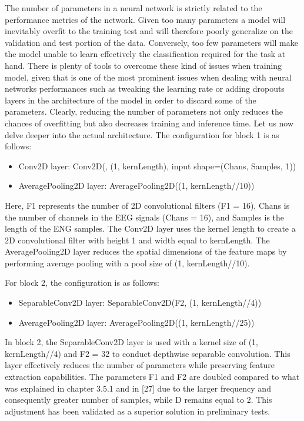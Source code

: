 \documentclass{Configuration_Files/PoliMi3i_thesis}
\begin{document}
The number of parameters in a neural network is strictly related to the performance metrics of the network.
Given too many parameters a model will inevitably overfit to the training test and will therefore poorly generalize on the validation and test portion of the data. Conversely, too few parameters will make the model unable to learn effectively the classification required for the task at hand.
There is plenty of tools to overcome these kind of issues when training model, given that is one of the most prominent issues when dealing with neural networks performances such as tweaking the learning rate or adding dropouts layers in the architecture of the model in order to discard some of the parameters.
Clearly, reducing the number of parameters not only reduces the chances of overfitting but also decreases training and inference time.
Let us now delve deeper into the actual architecture.
The configuration for block 1 is as follows:
\begin{itemize}
\item Conv2D layer: Conv2D(, (1, kernLength), input shape=(Chans, Samples, 1))
\item AveragePooling2D layer: AveragePooling2D((1, kernLength//10))
\end{itemize}

Here, F1 represents the number of 2D convolutional filters (F1 = 16), Chans is the number of channels in the EEG signals (Chans = 16), and Samples is the length of the ENG samples. The Conv2D layer uses the kernel length to create a 2D convolutional filter with height 1 and width equal to kernLength. The AveragePooling2D layer reduces the spatial dimensions of the feature maps by performing average pooling with a pool size of (1, kernLength//10).

For block 2, the configuration is as follows:
\begin{itemize}
\item SeparableConv2D layer: SeparableConv2D(F2, (1, kernLength//4))
\item AveragePooling2D layer: AveragePooling2D((1, kernLength//25))
\end{itemize}

In block 2, the SeparableConv2D layer is used with a kernel size of (1, kernLength//4) and F2 = 32 to conduct depthwise separable convolution. This layer effectively reduces the number of parameters while preserving feature extraction capabilities. The parameters F1 and F2 are doubled compared to what was explained in chapter 3.5.1 and in [27] due to the larger frequency and consequently greater number of samples, while D remains equal to 2. This adjustment has been validated as a superior solution in preliminary tests.
\end{document}
